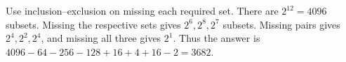 Use inclusion--exclusion on missing each required set. There are $2^{12}=4096$ subsets. Missing the respective sets gives $2^6,2^8,2^7$ subsets. Missing pairs gives $2^4,2^2,2^4$, and missing all three gives $2^1$. Thus the answer is $4096-64-256-128+16+4+16-2=\boxed{3682}$.
